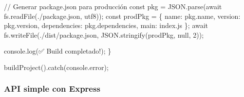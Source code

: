 \documentclass[
  11pt,
  letterpaper,
  oneside,
  openany]{scrbook}
\newenvironment{Shaded}{}{}
\newcommand{\AttributeTok}[1]{\textcolor[rgb]{0.84,0.23,0.29}{#1}}
\newcommand{\BuiltInTok}[1]{\textcolor[rgb]{0.84,0.23,0.29}{#1}}
\newcommand{\CommentTok}[1]{\textcolor[rgb]{0.42,0.45,0.49}{#1}}
\newcommand{\ControlFlowTok}[1]{\textcolor[rgb]{0.84,0.23,0.29}{#1}}
\newcommand{\DataTypeTok}[1]{\textcolor[rgb]{0.84,0.23,0.29}{#1}}
\newcommand{\DecValTok}[1]{\textcolor[rgb]{0.00,0.36,0.77}{#1}}
\newcommand{\FunctionTok}[1]{\textcolor[rgb]{0.44,0.26,0.76}{#1}}
\newcommand{\KeywordTok}[1]{\textcolor[rgb]{0.84,0.23,0.29}{#1}}
\newcommand{\NormalTok}[1]{\textcolor[rgb]{0.14,0.16,0.18}{#1}}
\newcommand{\OperatorTok}[1]{\textcolor[rgb]{0.14,0.16,0.18}{#1}}
\newcommand{\StringTok}[1]{\textcolor[rgb]{0.01,0.18,0.38}{#1}}
\begin{document}
\begin{Shaded}
\begin{Highlighting}[]
    \CommentTok{// Generar package.json para producción}
    \KeywordTok{const}\NormalTok{ pkg }\OperatorTok{=} \BuiltInTok{JSON}\OperatorTok{.}\FunctionTok{parse}\NormalTok{(}\ControlFlowTok{await}\NormalTok{ fs}\OperatorTok{.}\FunctionTok{readFile}\NormalTok{(}\StringTok{\textquotesingle{}./package.json\textquotesingle{}}\OperatorTok{,} \StringTok{\textquotesingle{}utf8\textquotesingle{}}\NormalTok{))}\OperatorTok{;}
    \KeywordTok{const}\NormalTok{ prodPkg }\OperatorTok{=}\NormalTok{ \{}
        \DataTypeTok{name}\OperatorTok{:}\NormalTok{ pkg}\OperatorTok{.}\AttributeTok{name}\OperatorTok{,}
        \DataTypeTok{version}\OperatorTok{:}\NormalTok{ pkg}\OperatorTok{.}\AttributeTok{version}\OperatorTok{,}
        \DataTypeTok{dependencies}\OperatorTok{:}\NormalTok{ pkg}\OperatorTok{.}\AttributeTok{dependencies}\OperatorTok{,}
        \DataTypeTok{main}\OperatorTok{:} \StringTok{\textquotesingle{}index.js\textquotesingle{}}
\NormalTok{    \}}\OperatorTok{;}
    \ControlFlowTok{await}\NormalTok{ fs}\OperatorTok{.}\FunctionTok{writeFile}\NormalTok{(}\StringTok{\textquotesingle{}./dist/package.json\textquotesingle{}}\OperatorTok{,} \BuiltInTok{JSON}\OperatorTok{.}\FunctionTok{stringify}\NormalTok{(prodPkg}\OperatorTok{,} \KeywordTok{null}\OperatorTok{,} \DecValTok{2}\NormalTok{))}\OperatorTok{;}
    
    \BuiltInTok{console}\OperatorTok{.}\FunctionTok{log}\NormalTok{(}\StringTok{\textquotesingle{}✅ Build completado!\textquotesingle{}}\NormalTok{)}\OperatorTok{;}
\NormalTok{\}}

\FunctionTok{buildProject}\NormalTok{()}\OperatorTok{.}\FunctionTok{catch}\NormalTok{(}\BuiltInTok{console}\OperatorTok{.}\FunctionTok{error}\NormalTok{)}\OperatorTok{;}
\end{Highlighting}
\end{Shaded}

\subsubsection{API simple con Express}\label{api-simple-con-express}
\end{document}
